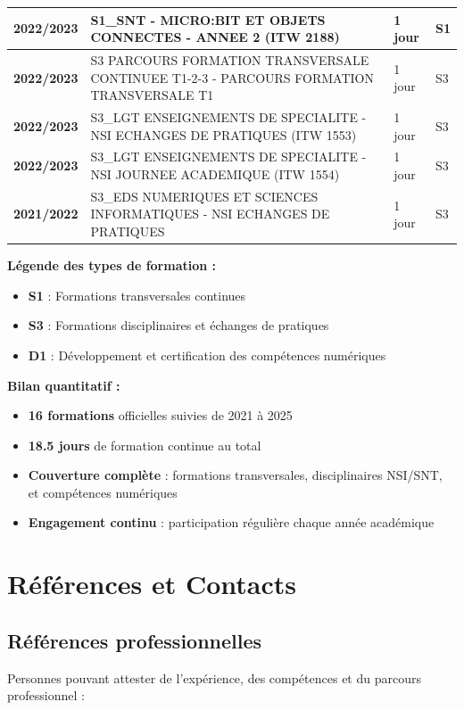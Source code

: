 \begin{longtable}{|p{2cm}|p{10cm}|p{2cm}|p{1.5cm}|}
\textbf{2022/2023} & S1\_SNT - MICRO:BIT ET OBJETS CONNECTES - ANNEE 2 (ITW 2188) & 1 jour & S1 \\
\hline

\textbf{2022/2023} & S3 PARCOURS FORMATION TRANSVERSALE CONTINUEE T1-2-3 - PARCOURS FORMATION TRANSVERSALE T1 & 1 jour & S3 \\
\hline

\textbf{2022/2023} & S3\_LGT ENSEIGNEMENTS DE SPECIALITE - NSI ECHANGES DE PRATIQUES (ITW 1553) & 1 jour & S3 \\
\hline

\textbf{2022/2023} & S3\_LGT ENSEIGNEMENTS DE SPECIALITE - NSI JOURNEE ACADEMIQUE (ITW 1554) & 1 jour & S3 \\
\hline

\textbf{2021/2022} & S3\_EDS NUMERIQUES ET SCIENCES INFORMATIQUES - NSI ECHANGES DE PRATIQUES & 1 jour & S3 \\
\hline

\end{longtable}

\textbf{Légende des types de formation :}
\begin{itemize}[leftmargin=*]
    \item \textbf{S1} : Formations transversales continues
    \item \textbf{S3} : Formations disciplinaires et échanges de pratiques
    \item \textbf{D1} : Développement et certification des compétences numériques
\end{itemize}

\textbf{Bilan quantitatif :}
\begin{itemize}[leftmargin=*]
    \item \textbf{16 formations} officielles suivies de 2021 à 2025
    \item \textbf{18.5 jours} de formation continue au total
    \item \textbf{Couverture complète} : formations transversales, disciplinaires NSI/SNT, et compétences numériques
    \item \textbf{Engagement continu} : participation régulière chaque année académique
\end{itemize}

\section{Références et Contacts}

\subsection{Références professionnelles}
Personnes pouvant attester de l'expérience, des compétences et du parcours professionnel :

